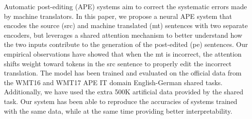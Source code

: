 Automatic post-editing (APE) systems aim to correct the systematic errors made by machine translators. In this paper, we propose a neural APE system that encodes the source (src) and machine translated (mt) sentences with two separate encoders, but leverages a shared attention mechanism to better understand how the two inputs contribute to the generation of the post-edited (pe) sentences. Our empirical observations have showed that when the mt is incorrect, the attention shifts weight toward tokens in the src sentence to properly edit the incorrect translation. The model has been trained and evaluated on the official data from the WMT16 and WMT17 APE IT domain English-German shared tasks. Additionally, we have used the extra 500K artificial data provided by the shared task. Our system has been able to reproduce the accuracies of systems trained with the same data, while at the same time providing better interpretability.
